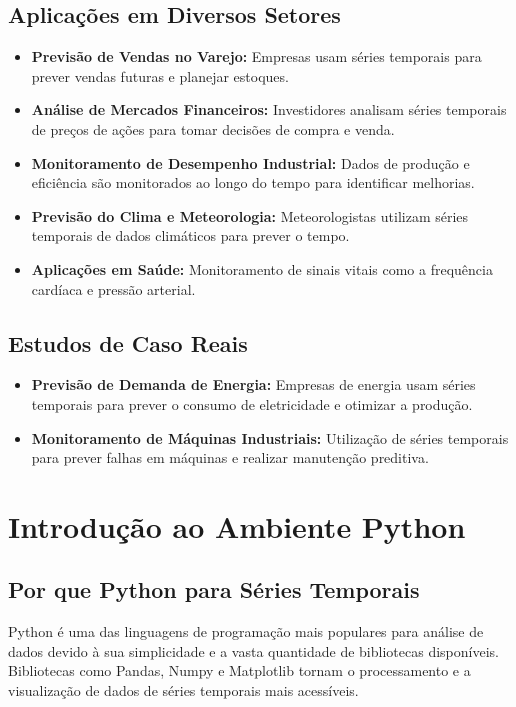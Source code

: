 \subsection{Aplicações em Diversos Setores}
\begin{itemize}
    \item \textbf{Previsão de Vendas no Varejo:} Empresas usam séries temporais para prever vendas futuras e planejar estoques.
    \item \textbf{Análise de Mercados Financeiros:} Investidores analisam séries temporais de preços de ações para tomar decisões de compra e venda.
    \item \textbf{Monitoramento de Desempenho Industrial:} Dados de produção e eficiência são monitorados ao longo do tempo para identificar melhorias.
    \item \textbf{Previsão do Clima e Meteorologia:} Meteorologistas utilizam séries temporais de dados climáticos para prever o tempo.
    \item \textbf{Aplicações em Saúde:} Monitoramento de sinais vitais como a frequência cardíaca e pressão arterial.
\end{itemize}

\subsection{Estudos de Caso Reais}
\begin{itemize}
    \item \textbf{Previsão de Demanda de Energia:} Empresas de energia usam séries temporais para prever o consumo de eletricidade e otimizar a produção.
    \item \textbf{Monitoramento de Máquinas Industriais:} Utilização de séries temporais para prever falhas em máquinas e realizar manutenção preditiva.
\end{itemize}

\section{Introdução ao Ambiente Python}

\subsection{Por que Python para Séries Temporais}
Python é uma das linguagens de programação mais populares para análise de dados devido à sua simplicidade e a vasta quantidade de bibliotecas disponíveis. Bibliotecas como Pandas, Numpy e Matplotlib tornam o processamento e a visualização de dados de séries temporais mais acessíveis.

